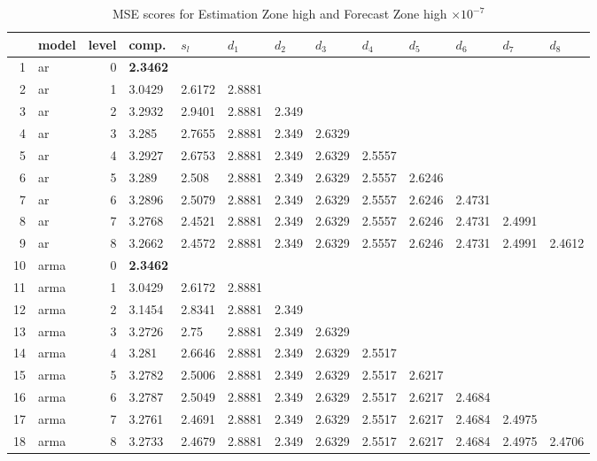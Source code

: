 \documentclass[10pt,a4paper]{article}
\begin{document}
\begin{table}[ht]
\centering
\caption{MSE scores for Estimation Zone high and Forecast Zone high $ \times 10^{-7}$} 
\begin{tabular}{rlrllllllllll}
  \hline
 & model & level & comp. & $s_l$ & $d_1$ & $d_2$ & $d_3$ & $d_4$ & $d_5$ & $d_6$ & $d_7$ & $d_8$ \\ 
  \hline
1 & ar &     0 & \textbf{2.3462} &  &  &  &  &  &  &  &  &  \\ 
  2 & ar &     1 & 3.0429 & 2.6172 & 2.8881 &  &  &  &  &  &  &  \\ 
  3 & ar &     2 & 3.2932 & 2.9401 & 2.8881 & 2.349 &  &  &  &  &  &  \\ 
  4 & ar &     3 & 3.285 & 2.7655 & 2.8881 & 2.349 & 2.6329 &  &  &  &  &  \\ 
  5 & ar &     4 & 3.2927 & 2.6753 & 2.8881 & 2.349 & 2.6329 & 2.5557 &  &  &  &  \\ 
  6 & ar &     5 & 3.289 & 2.508 & 2.8881 & 2.349 & 2.6329 & 2.5557 & 2.6246 &  &  &  \\ 
  7 & ar &     6 & 3.2896 & 2.5079 & 2.8881 & 2.349 & 2.6329 & 2.5557 & 2.6246 & 2.4731 &  &  \\ 
  8 & ar &     7 & 3.2768 & 2.4521 & 2.8881 & 2.349 & 2.6329 & 2.5557 & 2.6246 & 2.4731 & 2.4991 &  \\ 
  9 & ar &     8 & 3.2662 & 2.4572 & 2.8881 & 2.349 & 2.6329 & 2.5557 & 2.6246 & 2.4731 & 2.4991 & 2.4612 \\ 
   \hline
10 & arma &     0 & \textbf{2.3462} &  &  &  &  &  &  &  &  &  \\ 
  11 & arma &     1 & 3.0429 & 2.6172 & 2.8881 &  &  &  &  &  &  &  \\ 
  12 & arma &     2 & 3.1454 & 2.8341 & 2.8881 & 2.349 &  &  &  &  &  &  \\ 
  13 & arma &     3 & 3.2726 & 2.75 & 2.8881 & 2.349 & 2.6329 &  &  &  &  &  \\ 
  14 & arma &     4 & 3.281 & 2.6646 & 2.8881 & 2.349 & 2.6329 & 2.5517 &  &  &  &  \\ 
  15 & arma &     5 & 3.2782 & 2.5006 & 2.8881 & 2.349 & 2.6329 & 2.5517 & 2.6217 &  &  &  \\ 
  16 & arma &     6 & 3.2787 & 2.5049 & 2.8881 & 2.349 & 2.6329 & 2.5517 & 2.6217 & 2.4684 &  &  \\ 
  17 & arma &     7 & 3.2761 & 2.4691 & 2.8881 & 2.349 & 2.6329 & 2.5517 & 2.6217 & 2.4684 & 2.4975 &  \\ 
  18 & arma &     8 & 3.2733 & 2.4679 & 2.8881 & 2.349 & 2.6329 & 2.5517 & 2.6217 & 2.4684 & 2.4975 & 2.4706 \\ 

\end{tabular}
\end{table}
\end{document}
